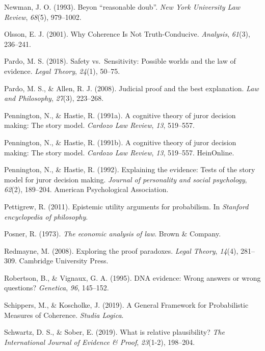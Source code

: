 \documentclass[11pt,dvipsnames,enabledeprecatedfontcommands]{scrartcl}
\begin{document}
\hypertarget{ref-newman1993}{}
Newman, J. O. (1993). Beyon ``reasonable doub''. \emph{New York
University Law Review}, \emph{68}(5), 979--1002.

\hypertarget{ref-olsson2001}{}
Olsson, E. J. (2001). Why Coherence Is Not Truth-Conducive.
\emph{Analysis}, \emph{61}(3), 236--241.

\hypertarget{ref-pardo2018}{}
Pardo, M. S. (2018). Safety vs.~Sensitivity: Possible worlds and the law
of evidence. \emph{Legal Theory}, \emph{24}(1), 50--75.

\hypertarget{ref-Pardo2008judicial}{}
Pardo, M. S., \& Allen, R. J. (2008). Judicial proof and the best
explanation. \emph{Law and Philosophy}, \emph{27}(3), 223--268.

\hypertarget{ref-Pennington1991}{}
Pennington, N., \& Hastie, R. (1991a). A cognitive theory of juror
decision making: The story model. \emph{Cardozo Law Review}, \emph{13},
519--557.

\hypertarget{ref-pennington1991cognitive}{}
Pennington, N., \& Hastie, R. (1991b). A cognitive theory of juror
decision making: The story model. \emph{Cardozo Law Review}, \emph{13},
519--557. HeinOnline.

\hypertarget{ref-pennington1992explaining}{}
Pennington, N., \& Hastie, R. (1992). Explaining the evidence: Tests of
the story model for juror decision making. \emph{Journal of personality
and social psychology}, \emph{62}(2), 189--204. American Psychological
Association.

\hypertarget{ref-Pettigrew2011Epistemic-Utili}{}
Pettigrew, R. (2011). Epistemic utility arguments for probabilism. In
\emph{Stanford encyclopedia of philosophy}.

\hypertarget{ref-Posner1973}{}
Posner, R. (1973). \emph{The economic analysis of law}. Brown \&
Company.

\hypertarget{ref-redmayne2008exploring}{}
Redmayne, M. (2008). Exploring the proof paradoxes. \emph{Legal Theory},
\emph{14}(4), 281--309. Cambridge University Press.

\hypertarget{ref-Robertson1995evidence}{}
Robertson, B., \& Vignaux, G. A. (1995). DNA evidence: Wrong answers or
wrong questions? \emph{Genetica}, \emph{96}, 145--152.

\hypertarget{ref-Schippers2019General}{}
Schippers, M., \& Koscholke, J. (2019). A General Framework for
Probabilistic Measures of Coherence. \emph{Studia Logica}.

\hypertarget{ref-schwartz2019WhatRelativePlausibility}{}
Schwartz, D. S., \& Sober, E. (2019). What is relative plausibility?
\emph{The International Journal of Evidence \& Proof}, \emph{23}(1-2),
198--204.
\end{document}
